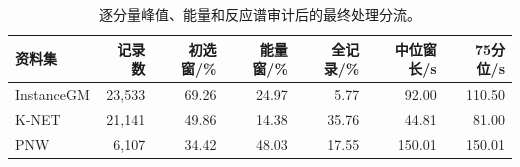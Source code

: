 \begin{table}[!htbp]
\centering
\caption{逐分量峰值、能量和反应谱审计后的最终处理分流。}
\label{tab:stability}
\begin{singlespace}
\footnotesize
\setlength{\tabcolsep}{3pt}
\begin{tabular}{lrrrrrr}
\toprule
资料集 & 记录数 & 初选窗/\% & 能量窗/\% & 全记录/\% & 中位窗长/s & 75分位/s \\
\midrule
InstanceGM & 23,533 & 69.26 & 24.97 & 5.77 & 92.00 & 110.50 \\
K-NET & 21,141 & 49.86 & 14.38 & 35.76 & 44.81 & 81.00 \\
PNW & 6,107 & 34.42 & 48.03 & 17.55 & 150.01 & 150.01 \\
\bottomrule
\end{tabular}
\end{singlespace}
\end{table}
